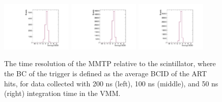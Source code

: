 \begin{figure}[!htpb]
  \begin{center}
    \includegraphics[width=0.3\textwidth]{figures/gbtanalysis3530/avg_BCID.pdf}
    \includegraphics[width=0.3\textwidth]{figures/gbtanalysis3527/avg_BCID.pdf}
    \includegraphics[width=0.3\textwidth]{figures/gbtanalysis3528/avg_BCID.pdf}
  \end{center}
  \vspace{-10pt}
  \caption{The time resolution of the MMTP relative to the scintillator, where the BC of the trigger is defined as the average BCID of the ART hits, for data collected with 200 ns (left), 100 ns (middle), and 50 ns (right) integration time in the VMM.}
  \label{fig:integ_avg_bc}
\end{figure}

